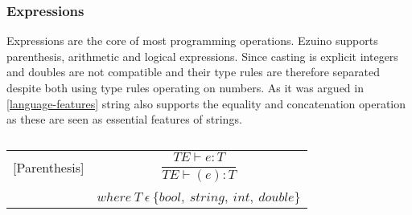 \subsubsection*{Expressions}
Expressions are the core of most programming operations. Ezuino supports parenthesis, arithmetic and logical expressions. Since casting is explicit integers and doubles are not compatible and their type rules are therefore separated despite both using type rules operating on numbers. As it was argued in \ref{language-features} string also supports the equality and concatenation operation as these are seen as essential features of strings.
\begin{table}[H]
    \begin{center}
    \begin{longtable}[c] { r c }
        [Parenthesis] 
        & 
        \( \dfrac{T E  \vdash  e  :  T}{T E  \vdash  (e)  :  T} \) 
        \\ \\
        & 
        \( {where \ T \ \epsilon \ \{ bool,\ string,\ int,\ double\}} \)
    \end{longtable}
    \caption{}\label{s-empty}
        \end{center}
\end{table}
 
